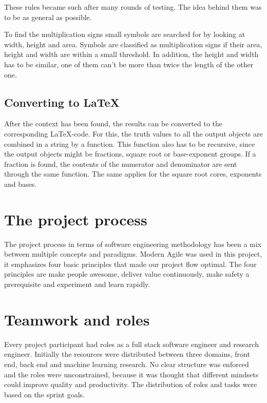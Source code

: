 These rules became such after many rounds of testing. The idea behind them was to be as general as possible.

To find the multiplication signs small symbols are searched for by looking at width, height and area. Symbols are classified as multiplication signs if their area, height and width are within a small threshold. In addition, the height and width has to be similar, one of them can't be more than twice the length of the other one.


\subsection{Converting to \LaTeX}
After the context has been found, the results can be converted to the corresponding \LaTeX -code. For this, the truth values to all the output objects are combined in a string by a function. This function also has to be recursive, since the output objects might be fractions, square root or base-exponent groups. If a fraction is found, the contents of the numerator and denominator are sent through the same function. The same applies for the square root cores, exponents and bases.

\section{The project process} %
The project process in terms of software engineering methodology has been a mix between multiple concepts and paradigms. Modern Agile was used in this project, it emphasizes four basic principles that made our project flow optimal. The four principles are make people awesome, deliver value continuously, make safety a prerequisite and experiment and learn rapidly. \cite{agile_modern_????}


\section{Teamwork and roles} %
Every project participant had roles as a full stack software engineer and research engineer. Initially the resources were distributed between three domains, front end, back end and machine learning research. No clear structure was enforced and the roles were unconstrained, because it was thought that different mindsets could improve quality and productivity. The distribution of roles and tasks were based on the sprint goals.
